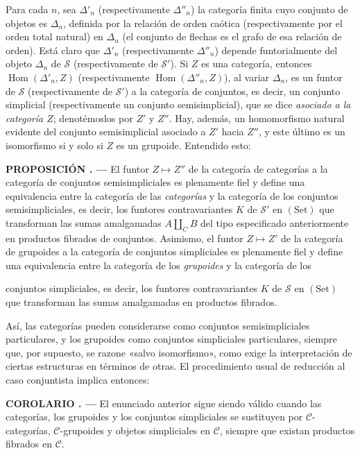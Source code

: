 \documentclass[11pt,twoside,openany]{book}
\numberwithin{equation}{section}
\newcommand{\src}[1]{%
  \phantomsection\hypertarget{src:#1}{}%
  \marginpar{\raggedleft\footnotesize\sffamily #1}%
}
\theoremstyle{plain}
\theoremstyle{definition}
\theoremstyle{remark}
\newcommand{\result}[2]{%
  \par\medskip\noindent\textbf{#1%
  \if\relax\detokenize{#2}\relax\else\space#2\fi. ---}\enspace
}
\newcommand{\FgaUnitKey}{frontmatter}
\renewcommand{\src}[1]{%
  \phantomsection\hypertarget{src:\FgaUnitKey:#1}{}%
  \marginpar{\raggedleft\footnotesize\sffamily #1}%
}
\theoremstyle{plain}
\theoremstyle{definition}
\theoremstyle{remark}
\begin{document}
Para cada $n$, sea $\Delta'_n$ (respectivamente $\Delta''_n$) la categoría
finita cuyo conjunto de objetos es $\Delta_n$, definida por la relación de
orden caótica (respectivamente por el orden total natural) en $\Delta_n$ (el
conjunto de flechas es el grafo de esa relación de orden). Está claro que
$\Delta'_n$ (respectivamente $\Delta''_n$) depende funtorialmente del objeto
$\Delta_n$ de $\mathcal S$ (respectivamente de $\mathcal S'$). Si $Z$ es una
categoría, entonces $\operatorname{Hom}(\Delta'_n,Z)$ (respectivamente
$\operatorname{Hom}(\Delta''_n,Z)$), al variar $\Delta_n$, es un funtor de
$\mathcal S$ (respectivamente de $\mathcal S'$) a la categoría de conjuntos,
es decir, un conjunto simplicial (respectivamente un conjunto
semisimplicial), que se dice \emph{asociado a la categoría $Z$}; denotémoslos
por $Z'$ y $Z''$. Hay, además, un homomorfismo natural evidente del conjunto
semisimplicial asociado a $Z'$ hacia $Z''$, y este último es un isomorfismo si
y solo si $Z$ es un grupoide. Entendido esto:

\result{PROPOSICIÓN}{4.1} El funtor $Z\longmapsto Z''$ de la categoría de
categorías a la categoría de conjuntos semisimpliciales es plenamente fiel y
define una equivalencia entre la categoría de las \emph{categorías} y la
categoría de los conjuntos semisimpliciales, es decir, los funtores
contravariantes $K$ de $\mathcal S'$ en $(\mathrm{Set})$ que transforman las
sumas amalgamadas $A\amalg_C B$ del tipo especificado anteriormente en productos
fibrados de conjuntos. Asimismo, el funtor $Z\longmapsto Z'$ de la categoría
de grupoides a la categoría de conjuntos simpliciales es plenamente fiel y
define una equivalencia entre la categoría de los \emph{grupoides} y la
categoría de los
\src{109}
conjuntos simpliciales, es decir, los funtores contravariantes $K$ de
$\mathcal S$ en $(\mathrm{Set})$ que transforman las sumas amalgamadas en productos
fibrados.

Así, las categorías pueden considerarse como conjuntos semisimpliciales
particulares, y los grupoides como conjuntos simpliciales particulares,
siempre que, por supuesto, se razone «salvo isomorfismo», como exige la
interpretación de ciertas estructuras en términos de otras. El procedimiento
usual de reducción al caso conjuntista implica entonces:

\result{COROLARIO}{4.2} El enunciado anterior sigue siendo válido cuando las
categorías, los grupoides y los conjuntos simpliciales se sustituyen por
$\mathcal C$-categorías, $\mathcal C$-grupoides y objetos simpliciales en
$\mathcal C$, siempre que existan productos fibrados en $\mathcal C$.
\end{document}
